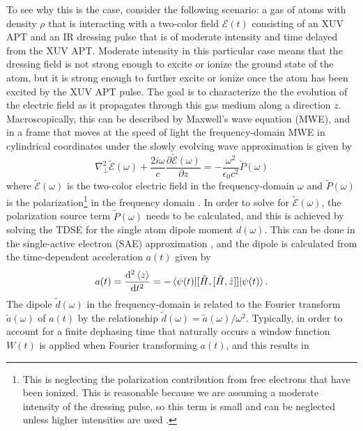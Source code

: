 To see why this is the case, consider the following scenario: a gas of atoms with density $\rho$ that is interacting with a two-color field $\mathcal{E}(t)$ consisting of an XUV APT and an IR dressing pulse that is of moderate intensity and time delayed from the XUV APT. Moderate intensity in this particular case means that the dressing field is not strong enough to excite or ionize the ground state of the atom, but it is strong enough to further excite or ionize once the atom has been excited by the XUV APT pulse.  The goal is to characterize the the evolution of the electric field as it propagates through this gas medium along a direction $z$. Macroscopically, this can be described by Maxwell's wave equation (MWE), and in a frame that moves at the speed of light the frequency-domain MWE in cylindrical coordinates under the slowly evolving wave approximation is given by
\begin{equation}
	\label{eqn:MWE}
	\nabla_{\perp}^{2}\tilde{\mathcal{E}}(\omega) + \frac{2i\omega}{c}\frac{\partial \tilde{\mathcal{E}}(\omega)}{\partial z} = -\frac{\omega^2}{\epsilon_0 c^2}\tilde{P}(\omega)
\end{equation}
where $\tilde{\mathcal{E}}(\omega)$ is the two-color electric field in the frequency-domain $\omega$ and $\tilde{P}(\omega)$ is the polarization\footnote{This is neglecting the polarization contribution from free electrons that have been ionized.  This is reasonable because we are assuming a moderate intensity of the dressing pulse, so this term is small and can be neglected unless higher intensities are used \cite{gaardeTransientAbsorptionReshaping2011}.} in the frequency domain \cite{jacksonClassicalElectrodynamics1999, brabecIntenseFewcycleLaser2000, wuTheoryStrongfieldAttosecond2016, gaardeTransientAbsorptionReshaping2011}. In order to solve for $\tilde{\mathcal{E}}(\omega)$, the polarization source term $\tilde{P}(\omega)$ needs to be calculated, and this is achieved by solving the TDSE for the single atom dipole moment $d(\omega)$.  This can be done in the single-active electron (SAE) approximation \cite{eberlyNumericalExperimentsStrong1992, schaferHighHarmonicGeneration1997}, and the dipole is calculated from the time-dependent acceleration $a(t)$ given by 
\begin{equation}
	a(t)=\frac{\mathop{}\!\mathrm{d}^2 \braket{z}}{\mathop{}\!\mathrm{d} t^2} = -\braket{\psi(t)|[\hat{H},[\hat{H},\hat{z}]]|\psi(t)}.
\end{equation}
The dipole $\tilde{d}(\omega)$ in the frequency-domain is related to the Fourier transform $\tilde{a}(\omega)$ of $a(t)$ by the relationship $\tilde{d}(\omega)=\tilde{a}(\omega)/\omega^2$.  Typically, in order to account for a finite dephasing time that naturally occurs a window function $W(t)$ is applied when Fourier transforming $a(t)$, and this results in
